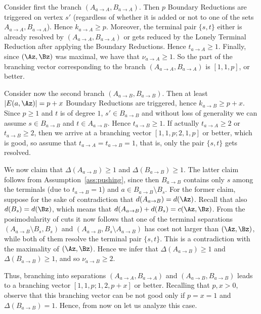 Consider first the branch $(A_{a\to A},B_{a\to A})$. Then $p$ Boundary Reductions are triggered on vertex $s'$ (regardless of whether it is added or not to one of the sets $A_{a\to A},B_{a\to A}$). Hence $k_{a\to A}\geq p$. Moreover, the terminal pair $\{s,t\}$ either is already resolved by $(A_{a\to A},B_{a\to A})$ or gets reduced by the Lonely Terminal Reduction after applying the Boundary Reductions. Hence $t_{a\to A}\geq 1$. Finally, since $(\Az,\Bz)$ was maximal, we have that $\nu_{a\to A}\geq 1$. So the part of the branching vector corresponding to the branch $(A_{a\to A},B_{a\to A})$ is $[1,1,p]$, or better.

Consider now the second branch $(A_{a\to B},B_{a\to B})$. Then at least $|E(a,\Az)|=p+x$ Boundary Reductions are triggered, hence $k_{a\to B}\geq p+x$. Since $p\geq 1$ and $t$ is of degree $1$, $s'\in B_{a\to B}$ and without loss of generality we can assume $s\in B_{a\to B}$ and $t\in A_{a\to B}$. Hence $t_{a\to B}\geq 1$. If actually $t_{a\to A}\geq 2$ or $t_{a\to B}\geq 2$, then we arrive at a branching vector $[1,1,p;2,1,p]$ or better, which is good, so assume that $t_{a\to A}=t_{a\to B}=1$, that is, only the pair $\{s,t\}$ gets resolved.

We now claim that $\Delta(A_{a\to B})\geq 1$ and $\Delta(B_{a\to B})\geq 1$. The latter claim follows from Assumption~\ref{ass:pushing}, since then $B_{a\to B}$ contains only $s$ among the terminals (due to $t_{a\to B}=1$) and $a\in B_{a\to B}\setminus B_s$. For the former claim, suppose for the sake of contradiction that $d(A_{a\to B})=d(\Az)$. Recall that also $d(B_s)=d(\Bz)$, which means that $d(A_{a\to B})+d(B_s)=c(\Az,\Bz)$. From the posimodularity of cuts it now follows that one of the terminal separations $(A_{a\to B}\setminus B_s,B_s)$ and $(A_{a\to B},B_s \setminus A_{a\to B})$ has cost not larger than $(\Az,\Bz)$, while both of them resolve the terminal pair $\{s,t\}$. This is a contradiction with the maximality of $(\Az,\Bz)$. Hence we infer that $\Delta(A_{a\to B})\geq 1$ and $\Delta(B_{a\to B})\geq 1$, and so $\nu_{a\to B}\geq 2$.

Thus, branching into separations $(A_{a\to A},B_{a\to A})$ and $(A_{a\to B},B_{a\to B})$ leads to a branching vector $[1,1,p;1,2,p+x]$ or better. Recalling that $p,x>0$, observe that this branching vector can be not good only if $p=x=1$ and $\Delta(B_{a\to B})=1$. Hence, from now on let us analyze this case.

